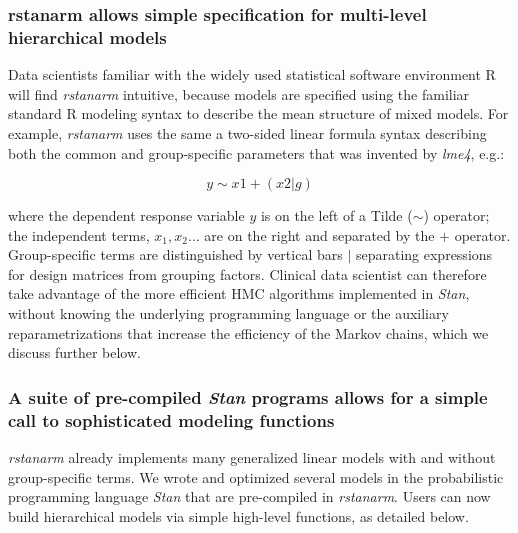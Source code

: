 \documentclass[11pt,notitlepage]{article}
\begin{document}
\subsubsection*{rstanarm allows simple specification for multi-level hierarchical models}

Data scientists familiar with the widely used statistical software environment R will 
find \textit{rstanarm} intuitive, because models are specified using the familiar 
standard R modeling syntax to describe the mean structure of mixed models. 
For example, \textit{rstanarm} uses the same a two-sided 
linear formula syntax describing both the common and group-specific parameters that was 
invented by \textit{lme4},  e.g.:

\begin{figure}
\vspace{-30pt}
\begin{equation}
y \sim x1 +(x2|g)
\end{equation}
\vspace{-40pt}
\end{figure}

where the dependent response variable $y$ is on the left of a Tilde ($\sim$) operator; 
the independent terms, $x_1, x_2...$ are on the right and separated by the $+$ 
operator. Group-specific terms are distinguished by vertical bars $|$ 
separating expressions for design matrices from grouping factors. Clinical data 
scientist can therefore take advantage of the more efficient HMC algorithms implemented in \textit{Stan}, 
without knowing the underlying programming language or the auxiliary reparametrizations that 
increase the efficiency of the Markov chains, which we discuss further below.

\subsubsection*{A suite of pre-compiled \textit{Stan} programs allows for a simple call to sophisticated modeling functions}

\textit{rstanarm} already implements many generalized linear 
models with and without group-specific terms. We wrote and optimized several models 
in the probabilistic programming language \textit{Stan} that are
pre-compiled in \textit{rstanarm}. Users can now build hierarchical models via simple high-level functions, as detailed below.
\end{document}
